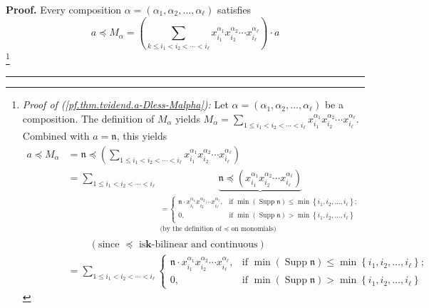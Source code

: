 \documentclass
[numbers=enddot,12pt,final,onecolumn,notitlepage,abstracton]{scrartcl}%
\theoremstyle{definition}
\newenvironment{proof}[1][Proof]{\noindent\textbf{#1.} }{\ \rule{0.5em}{0.5em}}
\newenvironment{verlong}{}{}
\let\sumnonlimits\sum
\renewcommand{\sum}{\sumnonlimits\limits}
\begin{document}
\begin{verlong}
\begin{proof}
Every composition $\alpha=\left(  \alpha_{1},\alpha_{2},\ldots,\alpha_{\ell
}\right)  $ satisfies%
\begin{equation}
a\left.  \preceq\right.  M_{\alpha}=\left(  \sum_{k\leq i_{1}<i_{2}%
<\cdots<i_{\ell}}x_{i_{1}}^{\alpha_{1}}x_{i_{2}}^{\alpha_{2}}\cdots
x_{i_{\ell}}^{\alpha_{\ell}}\right)  \cdot a
\label{pf.thm.tvidend.a-Dless-Malpha}%
\end{equation}
\footnote{\textit{Proof of (\ref{pf.thm.tvidend.a-Dless-Malpha}):} Let
$\alpha=\left(  \alpha_{1},\alpha_{2},\ldots,\alpha_{\ell}\right)  $ be a
composition. The definition of $M_{\alpha}$ yields $M_{\alpha}=\sum_{1\leq
i_{1}<i_{2}<\cdots<i_{\ell}}x_{i_{1}}^{\alpha_{1}}x_{i_{2}}^{\alpha_{2}}\cdots
x_{i_{\ell}}^{\alpha_{\ell}}$. Combined with $a=\mathfrak{n}$, this yields%
\begin{align*}
a\left.  \preceq\right.  M_{\alpha}  &  =\mathfrak{n}\left.  \preceq\right.
\left(  \sum_{1\leq i_{1}<i_{2}<\cdots<i_{\ell}}x_{i_{1}}^{\alpha_{1}}%
x_{i_{2}}^{\alpha_{2}}\cdots x_{i_{\ell}}^{\alpha_{\ell}}\right) \\
&  =\sum_{1\leq i_{1}<i_{2}<\cdots<i_{\ell}}\underbrace{\mathfrak{n}\left.
\preceq\right.  \left(  x_{i_{1}}^{\alpha_{1}}x_{i_{2}}^{\alpha_{2}}\cdots
x_{i_{\ell}}^{\alpha_{\ell}}\right)  }_{\substack{=
\begin{cases}
\mathfrak{n}\cdot x_{i_{1}}^{\alpha_{1}}x_{i_{2}}^{\alpha_{2}}\cdots
x_{i_{\ell}}^{\alpha_{\ell}}, & \text{if }\min\left(  \operatorname*{Supp}%
\mathfrak{n}\right)  \leq\min\left\{  i_{1},i_{2},\ldots,i_{\ell}\right\}  ;\\
0, & \text{if }\min\left(  \operatorname*{Supp}\mathfrak{n}\right)
>\min\left\{  i_{1},i_{2},\ldots,i_{\ell}\right\}
\end{cases}
\\\text{(by the definition of }\left.  \preceq\right.  \text{ on monomials)}%
}}\\
&  \ \ \ \ \ \ \ \ \ \ \left(  \text{since }\left.  \preceq\right.  \text{ is
}\mathbf{k}\text{-bilinear and continuous}\right) \\
&  =\sum_{1\leq i_{1}<i_{2}<\cdots<i_{\ell}}
\begin{cases}
\mathfrak{n}\cdot x_{i_{1}}^{\alpha_{1}}x_{i_{2}}^{\alpha_{2}}\cdots
x_{i_{\ell}}^{\alpha_{\ell}}, & \text{if }\min\left(  \operatorname*{Supp}%
\mathfrak{n}\right)  \leq\min\left\{  i_{1},i_{2},\ldots,i_{\ell}\right\}  ;\\
0, & \text{if }\min\left(  \operatorname*{Supp}\mathfrak{n}\right)
>\min\left\{  i_{1},i_{2},\ldots,i_{\ell}\right\}

\end{cases}
\end{align*}}
\end{proof}
\end{verlong}
\end{document}
